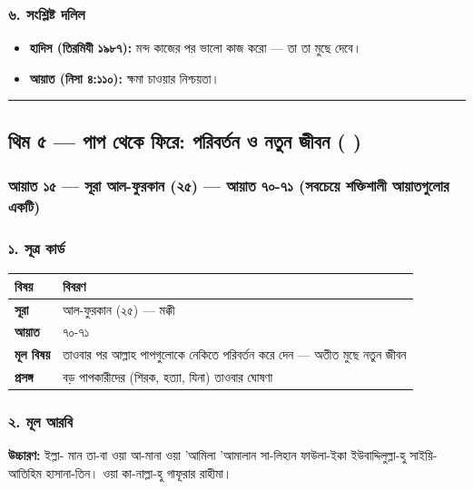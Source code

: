 \subsubsection*{৬. সংশ্লিষ্ট দলিল}

\begin{itemize}
\item \textbf{হাদিস (তিরমিযী ১৯৮৭):} মন্দ কাজের পর ভালো কাজ করো — তা তা মুছে দেবে।
\item \textbf{আয়াত (নিসা ৪:১১০):} ক্ষমা চাওয়ার নিশ্চয়তা।
\end{itemize}
\medskip\hrule\medskip

\subsection*{থিম ৫ — পাপ থেকে ফিরে: পরিবর্তন ও নতুন জীবন (   )}

\subsubsection*{আয়াত ১৫ — সূরা আল-ফুরকান (২৫) — আয়াত ৭০-৭১ (সবচেয়ে শক্তিশালী আয়াতগুলোর একটি)}

\subsubsection*{১. সূত্র কার্ড}

\begin{table}[h]\centering\small
\begin{tabular}{ll}
বিষয় & বিবরণ \\
\hline
\textbf{সূরা} & আল-ফুরকান (২৫) — মক্কী \\
\textbf{আয়াত} & ৭০-৭১ \\
\textbf{মূল বিষয়} & তাওবার পর আল্লাহ পাপগুলোকে নেকিতে পরিবর্তন করে দেন — অতীত মুছে নতুন জীবন \\
\textbf{প্রসঙ্গ} & বড় পাপকারীদের (শিরক, হত্যা, যিনা) তাওবার ঘোষণা \\
\hline
\end{tabular}
\end{table}

\subsubsection*{২. মূল আরবি}

\begin{center}\end{center}
\textbf{উচ্চারণ:} ইল্লা- মান তা-বা ওয়া আ-মানা ওয়া 'আমিলা 'আমালান সা-লিহান ফাউলা-ইকা ইউবাদ্দিলুল্লা-হু সাইয়ি-আতিহিম হাসানা-তিন। ওয়া কা-নাল্লা-হু গাফূরার রাহীমা।

